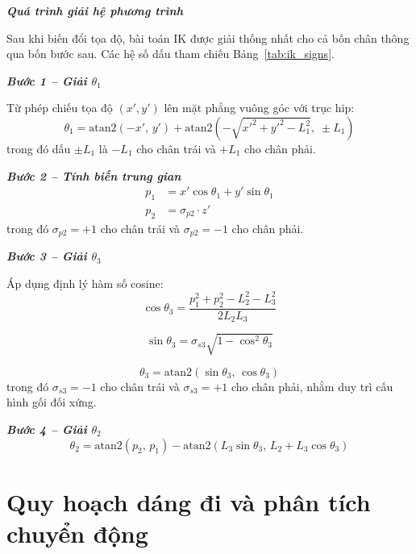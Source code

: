 \textbf{\textit{Quá trình giải hệ phương trình}} 

Sau khi biến đổi tọa độ, bài toán IK được giải thống nhất cho cả bốn chân thông qua bốn bước sau. Các hệ số dấu tham chiếu Bảng~\ref{tab:ik_signs}.

\textbf{\textit{Bước 1 -- Giải $\theta_1$}} 

Từ phép chiếu tọa độ $(x', y')$ lên mặt phẳng vuông góc với trục hip:
\begin{equation}
\theta_1 =
\mathrm{atan2}(-x',\, y')
+
\mathrm{atan2}
\left(
-\sqrt{x'^2 + y'^2 - L_1^2},\; \pm L_1
\right)
\label{eq:ik_theta1}
\end{equation}
trong đó dấu $\pm L_1$ là $-L_1$ cho chân trái và $+L_1$ cho chân phải.

\textbf{\textit{Bước 2 -- Tính biến trung gian}}
\begin{equation}
\begin{aligned}
p_1 &= x' \cos\theta_1 + y' \sin\theta_1 \\
p_2 &= \sigma_{p2} \cdot z'
\end{aligned}
\label{eq:ik_p1p2}
\end{equation}
trong đó $\sigma_{p2} = +1$ cho chân trái và $\sigma_{p2} = -1$ cho chân phải.

\textbf{\textit{Bước 3 -- Giải $\theta_3$}} 

Áp dụng định lý hàm số cosine:
\begin{equation}
\cos\theta_3 =
\frac{p_1^2 + p_2^2 - L_2^2 - L_3^2}{2 L_2 L_3}
\end{equation}

\begin{equation}
\sin\theta_3 =
\sigma_{s3} \sqrt{1 - \cos^2\theta_3}
\end{equation}

\begin{equation}
\theta_3 = \mathrm{atan2}(\sin\theta_3,\, \cos\theta_3)
\end{equation}
trong đó $\sigma_{s3} = -1$ cho chân trái và $\sigma_{s3} = +1$ cho chân phải, nhằm duy trì cấu hình gối đối xứng.

\textbf{\textit{Bước 4 -- Giải $\theta_2$}}
\begin{equation}
\theta_2 =
\mathrm{atan2}(p_2,\, p_1)
-
\mathrm{atan2}(L_3 \sin\theta_3,\, L_2 + L_3 \cos\theta_3)
\label{eq:ik_theta2}
\end{equation}

\section{Quy hoạch dáng đi và phân tích chuyển động }

